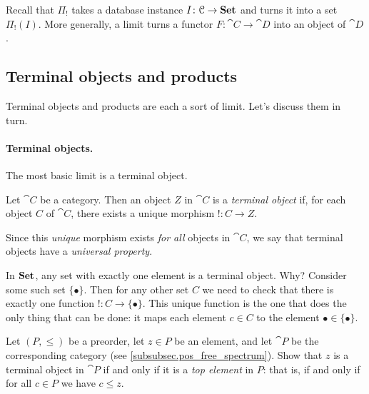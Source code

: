 \documentclass[7Sketches]{subfiles}
\begin{document}
Recall that $\Pi_!$ takes a database instance $I\colon \mathcal{C} \to \mathbf{Set}$ and turns it
into a set $\Pi_!(I)$. More generally, a limit turns a functor $F\colon \cat{C} \to
\cat{D}$ into an object of $\cat{D}$. 

\subsection{Terminal objects and products} %
\label{subsec.terminals_products}

Terminal objects and products are each a sort of limit. Let's discuss them in turn.

\paragraph{Terminal objects.}%
%
The most basic limit is a terminal object.
\begin{definition}%
Let $\cat{C}$ be a category. Then an object $Z$ in $\cat{C}$ is a \emph{terminal
object} if, for each object $C$ of $\cat{C}$, there exists a unique morphism
$!\colon C \to Z$.
\end{definition}

Since this \emph{unique} morphism exists \emph{for all} objects in $\cat{C}$, we
say that terminal objects have a \emph{universal property}.%
%

\begin{example}
In $\mathbf{Set}$, any set with exactly one element is a terminal object. Why?
Consider some such set $\{\bullet\}$. Then for any other set $C$ we need to
check that there is exactly one function $!\colon C \to \{\bullet\}$. This
unique function is the one that does the only thing that can be done: it maps
each element $c \in C$ to the element $\bullet \in \{\bullet\}$.
\end{example}

\begin{exercise}%
\label{exc.terminal_in_preorder}
Let $(P,\le)$ be a preorder, let $z\in P$ be an element, and let $\cat{P}$ be the corresponding category (see \cref{subsubsec.pos_free_spectrum}). Show that $z$ is a terminal object in $\cat{P}$ if and
only if it is a \emph{top element} in $P$: that is, if and only if for all $c \in P$ we have $c \le
z$.
\end{exercise}%
\end{document}
